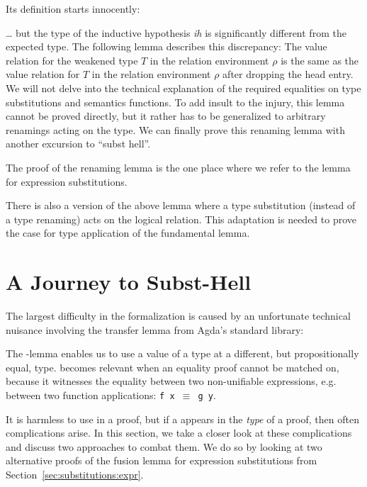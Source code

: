 \documentclass[sigplan,anonymous,review,screen]{acmart}
\begin{document}
Its definition starts innocently:
\LRVrenMCGLookupBody

{\dots} but the type of the inductive hypothesis \textit{ih} is
significantly different from the expected type.
The following lemma describes this discrepancy: The value relation for
the weakened type $T$ in the relation environment $\rho$ is the same
as the value relation for $T$ in the relation environment $\rho$ after
dropping the head entry. We will not delve into the technical
explanation of the required equalities on type substitutions and
semantics functions.
\LRVrenLRVwk
To add insult to the injury, this lemma cannot be proved directly, but
it rather has to be generalized to arbitrary renamings acting on the
type.
We can finally prove this renaming lemma with another excursion to
``subst hell''.
\LRVrenLRVrenEqType

The proof of the renaming lemma is the one place where we refer to the
lemma {\AFusionESubESub} for expression substitutions.

There is also a version {\ALRVsub} of the above lemma where a type substitution
(instead of a type renaming) acts on the logical relation. This
adaptation is needed to prove the case for type application of the
fundamental lemma.

\section{A Journey to Subst-Hell}
\label{sec:subst-hell}

The largest difficulty in the formalization is caused by an unfortunate
technical nuisance involving the transfer lemma {\Asubst} from Agda's standard library:

\SubstExamplesDef

The {\Asubst}-lemma enables us to use a value of a type at a different,
but propositionally equal, type.
{\Asubst} becomes relevant when an equality proof cannot be matched
on, because it witnesses the equality between two non-unifiable
expressions, e.g. between two function applications: \texttt{f~x~$\equiv$~g~y}.

It is harmless to use {\Asubst} in a proof, but if a {\Asubst} appears
in the \emph{type} of a proof, then often complications arise.
In this section, we take a closer look at these complications and
discuss two approaches to combat them. We do so by looking at two
alternative proofs of the fusion lemma for expression substitutions from
Section~\ref{sec:substitutions:expr}.
\end{document}
